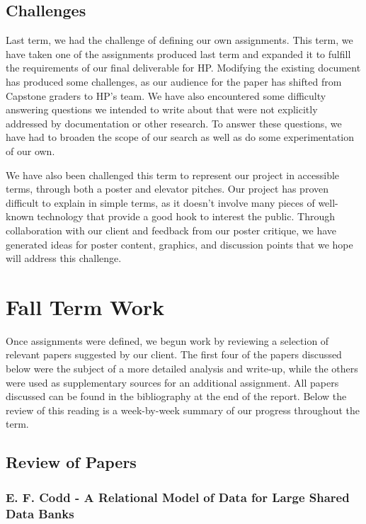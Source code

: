 \documentclass[onecolumn, draftclsnofoot,10pt, compsoc]{IEEEtran}
\begin{document}
\subsection{Challenges}
Last term, we had the challenge of defining our own assignments.
This term, we have taken one of the assignments produced last term and expanded it to fulfill the requirements of our final deliverable for HP.
Modifying the existing document has produced some challenges, as our audience for the paper has shifted from Capstone graders to HP’s team.
We have also encountered some difficulty answering questions we intended to write about that were not explicitly addressed by documentation or other research.
To answer these questions, we have had to broaden the scope of our search as well as do some experimentation of our own. 

We have also been challenged this term to represent our project in accessible terms, through both a poster and elevator pitches.
Our project has proven difficult to explain in simple terms, as it doesn’t involve many pieces of well-known technology that provide a good hook to interest the public.
Through collaboration with our client and feedback from our poster critique, we have generated ideas for poster content, graphics, and discussion points that we hope will address this challenge.

\section{Fall Term Work}

Once assignments were defined, we begun work by reviewing a selection of relevant papers suggested by our client. 
The first four of the papers discussed below were the subject of a more detailed analysis and write-up, while the others were used as supplementary sources for an additional assignment. 
All papers discussed can be found in the bibliography at the end of the report.
Below the review of this reading is a week-by-week summary of our progress throughout the term.

\subsection{Review of Papers}

\subsubsection{E. F. Codd - A Relational Model of Data for Large Shared Data Banks}
\end{document}
